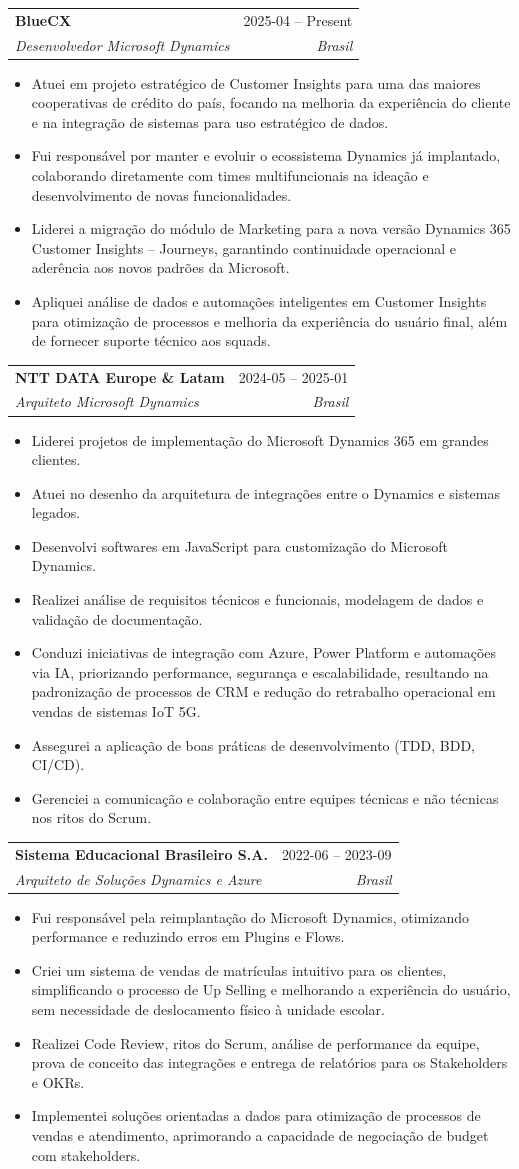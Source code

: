 \documentclass[a4paper,11pt]{article}
\makeatletter
\newcommand{\resumeItem}[1]{
  \item\small{
    {#1 \vspace{-2pt}}
  }
}
\newcommand{\resumeSubheading}[4]{
  \vspace{-1pt}\item
  \begin{tabular*}{0.97\textwidth}{l@{\extracolsep{\fill}}r}
    \textbf{#1} & #2 \\
    \textit{\small#3} & \textit{\small #4} \\
  \end{tabular*}\vspace{-5pt}
}
\newcommand{\resumeItemListStart}{\begin{itemize}}
\newcommand{\resumeItemListEnd}{\end{itemize}\vspace{-5pt}}
\makeatother
\begin{document}
\resumeSubheading
{BlueCX}{2025-04 – Present}
{Desenvolvedor Microsoft Dynamics}{Brasil}
\resumeItemListStart
\resumeItem{Atuei em projeto estratégico de Customer Insights para uma das maiores cooperativas de crédito do país, focando na melhoria da experiência do cliente e na integração de sistemas para uso estratégico de dados.}
\resumeItem{Fui responsável por manter e evoluir o ecossistema Dynamics já implantado, colaborando diretamente com times multifuncionais na ideação e desenvolvimento de novas funcionalidades.}
\resumeItem{Liderei a migração do módulo de Marketing para a nova versão Dynamics 365 Customer Insights – Journeys, garantindo continuidade operacional e aderência aos novos padrões da Microsoft.}
\resumeItem{Apliquei análise de dados e automações inteligentes em Customer Insights para otimização de processos e melhoria da experiência do usuário final, além de fornecer suporte técnico aos squads.}
\resumeItemListEnd

\resumeSubheading
{NTT DATA Europe \& Latam}{2024-05 – 2025-01}
{Arquiteto Microsoft Dynamics}{Brasil}
\resumeItemListStart
\resumeItem{Liderei projetos de implementação do Microsoft Dynamics 365 em grandes clientes.}
\resumeItem{Atuei no desenho da arquitetura de integrações entre o Dynamics e sistemas legados.}
\resumeItem{Desenvolvi softwares em JavaScript para customização do Microsoft Dynamics.}
\resumeItem{Realizei análise de requisitos técnicos e funcionais, modelagem de dados e validação de documentação.}
\resumeItem{Conduzi iniciativas de integração com Azure, Power Platform e automações via IA, priorizando performance, segurança e escalabilidade, resultando na padronização de processos de CRM e redução do retrabalho operacional em vendas de sistemas IoT 5G.}
\resumeItem{Assegurei a aplicação de boas práticas de desenvolvimento (TDD, BDD, CI/CD).}
\resumeItem{Gerenciei a comunicação e colaboração entre equipes técnicas e não técnicas nos ritos do Scrum.}
\resumeItemListEnd

\resumeSubheading
{Sistema Educacional Brasileiro S.A.}{2022-06 – 2023-09}
{Arquiteto de Soluções Dynamics e Azure}{Brasil}
\resumeItemListStart
\resumeItem{Fui responsável pela reimplantação do Microsoft Dynamics, otimizando performance e reduzindo erros em Plugins e Flows.}
\resumeItem{Criei um sistema de vendas de matrículas intuitivo para os clientes, simplificando o processo de Up Selling e melhorando a experiência do usuário, sem necessidade de deslocamento físico à unidade escolar.}
\resumeItem{Realizei Code Review, ritos do Scrum, análise de performance da equipe, prova de conceito das integrações e entrega de relatórios para os Stakeholders e OKRs.}
\resumeItem{Implementei soluções orientadas a dados para otimização de processos de vendas e atendimento, aprimorando a capacidade de negociação de budget com stakeholders.}
\resumeItemListEnd
\end{document}

